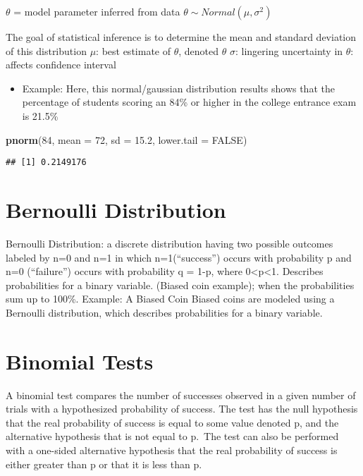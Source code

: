 \documentclass[
]{article}
\newenvironment{Shaded}{\begin{snugshade}}{\end{snugshade}}
\newcommand{\DataTypeTok}[1]{\textcolor[rgb]{0.13,0.29,0.53}{#1}}
\newcommand{\DecValTok}[1]{\textcolor[rgb]{0.00,0.00,0.81}{#1}}
\newcommand{\FloatTok}[1]{\textcolor[rgb]{0.00,0.00,0.81}{#1}}
\newcommand{\KeywordTok}[1]{\textcolor[rgb]{0.13,0.29,0.53}{\textbf{#1}}}
\newcommand{\NormalTok}[1]{#1}
\newcommand{\OtherTok}[1]{\textcolor[rgb]{0.56,0.35,0.01}{#1}}
\providecommand{\tightlist}{%
  \setlength{\itemsep}{0pt}\setlength{\parskip}{0pt}}
\begin{document}
\(\theta\) = model parameter inferred from data
\(\theta \sim Normal(\mu,\sigma^2)\)

The goal of statistical inference is to determine the mean and standard
deviation of this distribution \(\mu\): best estimate of \(\theta\),
denoted \(\theta\) \(\sigma\): lingering uncertainty in \(\theta\):
affects confidence interval

\begin{itemize}
\tightlist
\item
  Example: Here, this normal/gaussian distribution results shows that
  the percentage of students scoring an 84\% or higher in the college
  entrance exam is 21.5\%
\end{itemize}

\begin{Shaded}
\begin{Highlighting}[]
\KeywordTok{pnorm}\NormalTok{(}\DecValTok{84}\NormalTok{, }\DataTypeTok{mean =} \DecValTok{72}\NormalTok{, }\DataTypeTok{sd =} \FloatTok{15.2}\NormalTok{, }\DataTypeTok{lower.tail =} \OtherTok{FALSE}\NormalTok{)}
\end{Highlighting}
\end{Shaded}

\begin{verbatim}
## [1] 0.2149176
\end{verbatim}

\hypertarget{bernoulli-distribution}{%
\section{Bernoulli Distribution}\label{bernoulli-distribution}}

Bernoulli Distribution: a discrete distribution having two possible
outcomes labeled by n=0 and n=1 in which n=1(``success'') occurs with
probability p and n=0 (``failure'') occurs with probability q = 1-p,
where 0\textless p\textless1. Describes probabilities for a binary
variable. (Biased coin example); when the probabilities sum up to 100\%.
Example: A Biased Coin Biased coins are modeled using a Bernoulli
distribution, which describes probabilities for a binary variable.

\hypertarget{binomial-tests}{%
\section{Binomial Tests}\label{binomial-tests}}

A binomial test compares the number of successes observed in a given
number of trials with a hypothesized probability of success. The test
has the null hypothesis that the real probability of success is equal to
some value denoted p, and the alternative hypothesis that is not equal
to p.~The test can also be performed with a one-sided alternative
hypothesis that the real probability of success is either greater than p
or that it is less than p.~
\end{document}

